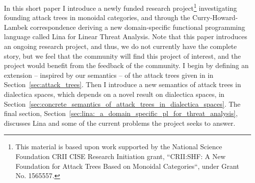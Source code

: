 \documentclass{sigplanconf}
\begin{document}
In this short paper I introduce a newly funded research
project\footnote{This material is based upon work supported by the
  National Science Foundation CRII CISE Research Initiation grant,
  ``CRII:SHF: A New Foundation for Attack Trees Based on Monoidal
  Categories``, under Grant No. 1565557.}  investigating founding
attack trees in monoidal categories, and through the
Curry-Howard-Lambek correspondence deriving a new domain-specific
functional programming language called Lina for Linear Threat
Analysis.  Note that this paper introduces an ongoing research
project, and thus, we do not currently have the complete story, but we
feel that the community will find this project of interest, and the
project would benefit from the feedback of the community.  I begin by
defining an extension -- inspired by our semantics -- of the attack
trees given in \cite{Jhawar:2015} in Section~\ref{sec:attack_trees}.
Then I introduce a new semantics of attack trees in dialectica spaces,
which depends on a novel result on dialectica spaces, in
Section~\ref{sec:concrete_semantics_of_attack_trees_in_dialectica_spaces}.
The final section,
Section~\ref{sec:lina:_a_domain_specific_pl_for_threat_analysis},
discusses Lina and some of the current problems the project seeks to
answer.
\end{document}
